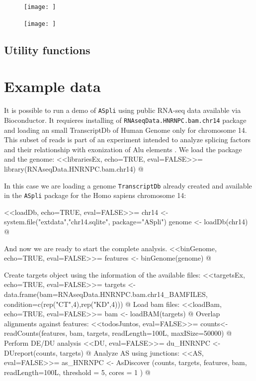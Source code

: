\documentclass{article}
\begin{document}
\begin{figure}
  \texttt{[image:  ]}
  \caption{}
  \label{fig:plotbinEx1} 
\end{figure}

\begin{figure}
  \texttt{[image:  ]}
  \caption{}
  \label{fig:plotbinEx2} 
\end{figure}

\subsection{Utility functions}

\section{Example data}
It is possible to run a demo of \texttt{ASpli} using public RNA-seq data available via Bioconductor. It requieres installing of \texttt{RNAseqData.HNRNPC.bam.chr14} package and loading  an small TranscriptDb of Human Genome only for chromosome 14. This subset of reads is part of an experiment intended to analyze splicing factors and their relationship with exonization of Alu elements \cite{Zarnack2013453}. We load the package and the genome:
<<librariesEx, echo=TRUE, eval=FALSE>>=
library(RNAseqData.HNRNPC.bam.chr14)
@

In this case we are loading a genome \texttt{TranscriptDb} already created and available in the  \texttt{ASpli} package for the Homo sapiens chromosome 14:

<<loadDb, echo=TRUE, eval=FALSE>>=
chr14 <- system.file("extdata","chr14.sqlite", package="ASpli")
genome <- loadDb(chr14)
@

And now we are ready to start the complete analysis.
<<binGenome, echo=TRUE, eval=FALSE>>=
features <- binGenome(genome) 
@

Create targets object using the information of the available files:
<<targetsEx, echo=TRUE, eval=FALSE>>=
targets <- data.frame(bam=RNAseqData.HNRNPC.bam.chr14_BAMFILES,
                       condition=c(rep("CT",4),rep("KD",4)))
@
Load bam files:
<<loadBam, echo=TRUE, eval=FALSE>>=
bam <- loadBAM(targets)
@
Overlap alignments against features:
<<todosJuntos, eval=FALSE>>=
counts<-readCounts(features, bam, targets, readLength=100L, maxISize=50000)
@
Perform DE/DU analysis
<<DU, eval=FALSE>>=
du_HNRNPC <- DUreport(counts, targets)
@
Analyze AS using junctions:
<<AS, eval=FALSE>>=
as_HNRNPC <- AsDiscover (counts, targets, features, bam, readLength=100L, threshold = 5, cores = 1 )
@
\end{document}
